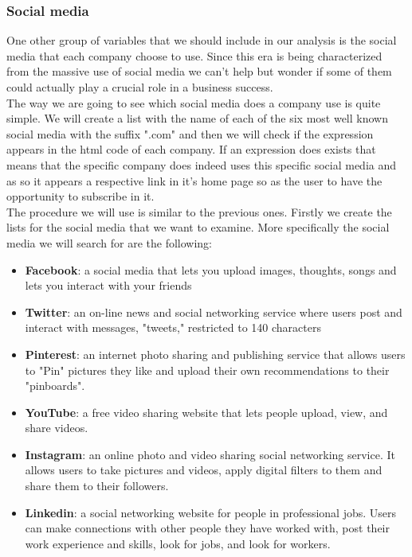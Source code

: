 \documentclass{article}
\begin{document}
\subsubsection{Social media}
One other group of variables that we should include in our analysis is the social media that each company choose to use. Since this era is being characterized from the massive use of social media we can't help but wonder if some of them could actually play a crucial role in a business success.\\
The way we are going to see which social media does a company use is quite simple. We will create a list with the name of each of the  six most well known social media with the suffix ".com" and then we will check if the expression appears in the html code of each company. If an expression does exists that means that the specific company does indeed uses this specific social media and as so it appears a respective link in it's home page so as the user to have the opportunity to subscribe in it.\\
The procedure we will use is similar to the previous ones. Firstly we create the lists for the social media that we want to examine. More specifically the social media we will search for are the following:
\begin{itemize}
\item\textbf{Facebook}: a social media that lets you upload images, thoughts, songs and lets you interact with your friends
\item\textbf{Twitter}: an on-line news and social networking service where users post and interact with messages, "tweets," restricted to 140 characters
\item\textbf{Pinterest}: an internet photo sharing and publishing service that allows users to "Pin" pictures they like and upload their own recommendations to their "pinboards".
\item\textbf{YouTube}: a free video sharing website that lets people upload, view, and share videos. 
\item\textbf{Instagram}: an online photo and video sharing social networking service. It allows users to take pictures and videos, apply digital filters to them and share them to their followers. 
\item\textbf{Linkedin}: a social networking website for people in professional jobs. Users can make connections with other people they have worked with, post their work experience and skills, look for jobs, and look for workers.
\end{itemize}
\end{document}
